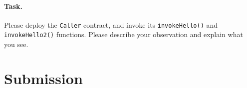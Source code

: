 \paragraph{Task.} Please deploy the \texttt{Caller} contract,
and invoke its \texttt{invokeHello()} and \texttt{invokeHello2()} 
functions. Please describe your 
observation and explain what you see. 

\section{Submission}

\seedsubmission






